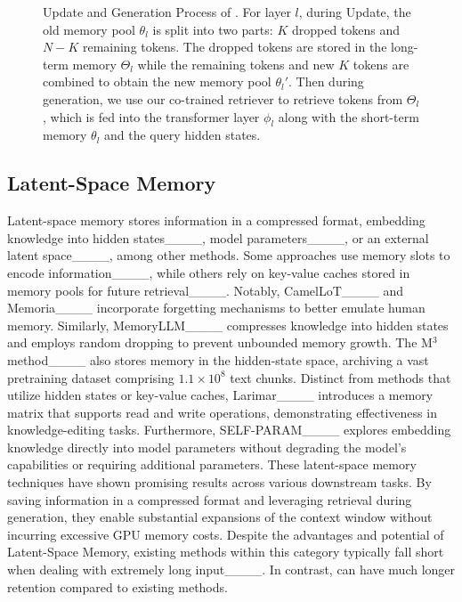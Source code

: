 \begin{figure*}[t]
\centering
{}
\hfill
{}
\vspace{-10pt}
\caption{Update and Generation Process of \ours. For layer $l$, during Update, the old memory pool $\theta_l$ is split into two parts: $K$ dropped tokens and $N-K$ remaining tokens. The dropped tokens are stored in the long-term memory $\Theta_l$ while the remaining tokens and new $K$ tokens are combined to obtain the new memory pool $\theta_l'$. Then during generation, we use our co-trained retriever to retrieve tokens from $\Theta_l$, which is fed into the transformer layer $\phi_l$ along with the short-term memory $\theta_l$ and the query hidden states.}
\label{fig:mplus_update_generate}
\vspace{-10pt}
\end{figure*}

\vspace{-5pt}
\subsection{Latent-Space Memory}
Latent-space memory stores information in a compressed format, embedding knowledge into hidden states____, model parameters____, or an external latent space____, among other methods. Some approaches use memory slots to encode information____, while others rely on key-value caches stored in memory pools for future retrieval____. Notably, CamelLoT____ and Memoria____ incorporate forgetting mechanisms to better emulate human memory. Similarly, MemoryLLM____ compresses knowledge into hidden states and employs random dropping to prevent unbounded memory growth. The M$^3$ method____ also stores memory in the hidden-state space, archiving a vast pretraining dataset comprising $1.1\times 10^8$ text chunks. Distinct from methods that utilize hidden states or key-value caches, Larimar____ introduces a memory matrix that supports read and write operations, demonstrating effectiveness in knowledge-editing tasks. Furthermore, SELF-PARAM____ explores embedding knowledge directly into model parameters without degrading the model's capabilities or requiring additional parameters. These latent-space memory techniques have shown promising results across various downstream tasks. By saving information in a compressed format and leveraging retrieval during generation, they enable substantial expansions of the context window without incurring excessive GPU memory costs.
Despite the advantages and potential of Latent-Space Memory, existing methods within this category typically fall short when dealing with extremely long input____. In contrast, \ours can have much longer retention compared to existing methods.